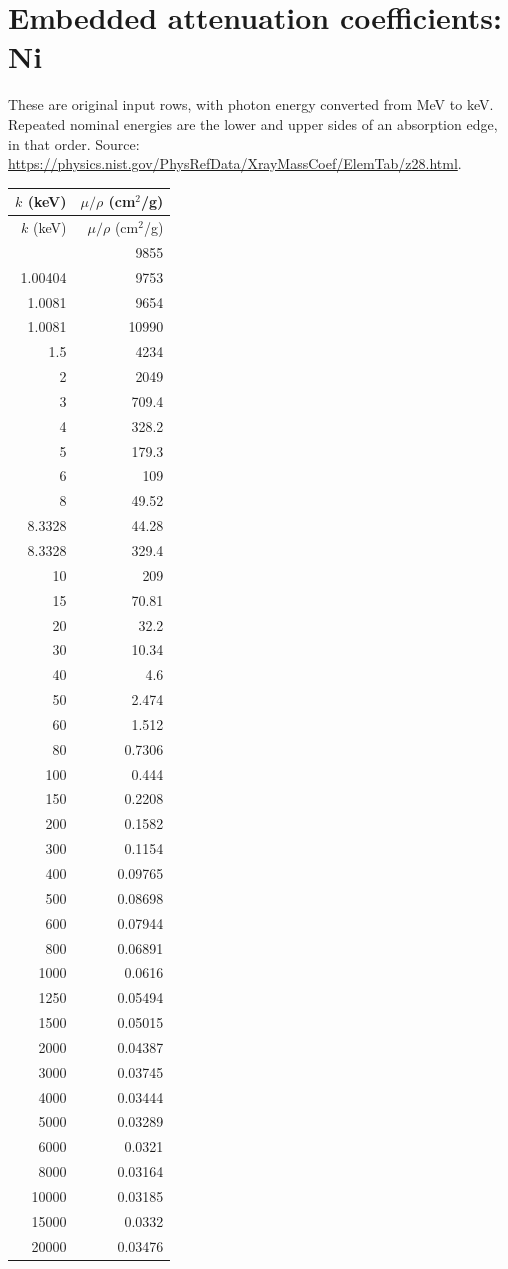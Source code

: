 \documentclass[10pt,a4paper]{article}
\begin{document}
\section{Embedded attenuation coefficients: Ni}
These are original input rows, with photon energy converted from MeV to keV. Repeated nominal energies are the lower and upper sides of an absorption edge, in that order. Source: \url{https://physics.nist.gov/PhysRefData/XrayMassCoef/ElemTab/z28.html}.
\small
\begin{longtable}{rr}
\toprule
$k$ (keV) & $\mu/\rho$ (cm$^2$/g) \\
\midrule
\endfirsthead
\toprule
$k$ (keV) & $\mu/\rho$ (cm$^2$/g) \\
\midrule
\endhead
\bottomrule
\endfoot
1 & 9855 \\
1.00404 & 9753 \\
1.0081 & 9654 \\
1.0081 & 10990 \\
1.5 & 4234 \\
2 & 2049 \\
3 & 709.4 \\
4 & 328.2 \\
5 & 179.3 \\
6 & 109 \\
8 & 49.52 \\
8.3328 & 44.28 \\
8.3328 & 329.4 \\
10 & 209 \\
15 & 70.81 \\
20 & 32.2 \\
30 & 10.34 \\
40 & 4.6 \\
50 & 2.474 \\
60 & 1.512 \\
80 & 0.7306 \\
100 & 0.444 \\
150 & 0.2208 \\
200 & 0.1582 \\
300 & 0.1154 \\
400 & 0.09765 \\
500 & 0.08698 \\
600 & 0.07944 \\
800 & 0.06891 \\
1000 & 0.0616 \\
1250 & 0.05494 \\
1500 & 0.05015 \\
2000 & 0.04387 \\
3000 & 0.03745 \\
4000 & 0.03444 \\
5000 & 0.03289 \\
6000 & 0.0321 \\
8000 & 0.03164 \\
10000 & 0.03185 \\
15000 & 0.0332 \\
20000 & 0.03476 \\
\end{longtable}
\normalsize
\clearpage
\end{document}
